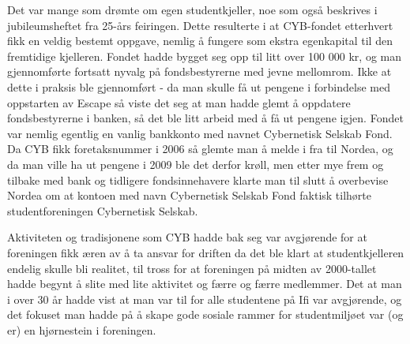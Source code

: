 Det var mange som drømte om egen studentkjeller, noe som også beskrives i jubileumsheftet fra 25-års feiringen. Dette resulterte i at CYB-fondet etterhvert fikk en veldig bestemt oppgave, nemlig å fungere som ekstra egenkapital til den fremtidige kjelleren. Fondet hadde bygget seg opp til litt over 100 000 kr, og man gjennomførte fortsatt nyvalg på fondsbestyrerne med jevne mellomrom. Ikke at dette i praksis ble gjennomført - da man skulle få ut pengene i forbindelse med oppstarten av Escape så viste det seg at man hadde glemt å oppdatere fondsbestyrerne i banken, så det ble litt arbeid med å få ut pengene igjen. Fondet var nemlig egentlig en vanlig bankkonto med navnet Cybernetisk Selskab Fond. Da CYB fikk foretaksnummer i 2006 så glemte man å melde i fra til Nordea, og da man ville ha ut pengene i 2009 ble det derfor krøll, men etter mye frem og tilbake med bank og tidligere fondsinnehavere klarte man til slutt å overbevise Nordea om at kontoen med navn Cybernetisk Selskab Fond faktisk tilhørte studentforeningen Cybernetisk Selskab.

Aktiviteten og tradisjonene som CYB hadde bak seg var avgjørende for at foreningen fikk æren av å ta ansvar for driften da det ble klart at studentkjelleren endelig skulle bli realitet, til tross for at foreningen på midten av 2000-tallet hadde begynt å slite med lite aktivitet og færre og færre medlemmer. Det at man i over 30 år hadde vist at man var til for alle studentene på Ifi var avgjørende, og det fokuset man hadde på å skape gode sosiale rammer for studentmiljøet var (og er) en hjørnestein i foreningen.


